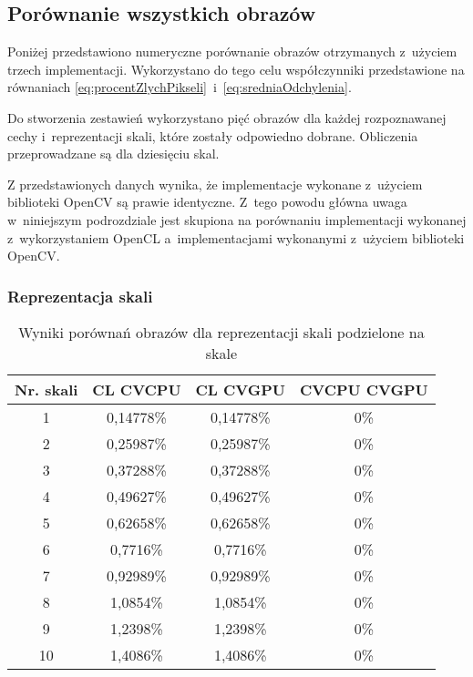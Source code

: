 \subsection{Porównanie wszystkich obrazów}
\label{subsec:porownanieNumerycznePoprawnosc}

Poniżej przedstawiono numeryczne porównanie obrazów otrzymanych z~użyciem trzech implementacji. Wykorzystano do tego celu współczynniki przedstawione na równaniach \ref{eq:procentZlychPikseli}~i~\ref{eq:sredniaOdchylenia}.

Do stworzenia zestawień wykorzystano pięć obrazów dla każdej rozpoznawanej cechy i~reprezentacji skali, które zostały odpowiedno dobrane. Obliczenia przeprowadzane są dla dziesięciu skal.

Z przedstawionych danych wynika, że implementacje wykonane z~użyciem biblioteki OpenCV są prawie identyczne. Z~tego powodu główna uwaga w~niniejszym podrozdziale jest skupiona na porównaniu implementacji wykonanej z~wykorzystaniem OpenCL a~implementacjami wykonanymi z~użyciem biblioteki OpenCV.
\subsubsection{Reprezentacja skali}
\label{subsubsec:reprezentacjaSakliTabele}

\begin{table}
\caption{Wyniki porównań obrazów dla reprezentacji skali podzielone na skale}
\label{tab:imageScaleRep}
\begin{tabular}{|c|c|c|c|}
 \hline
Nr. skali & CL \- CVCPU & CL \- CVGPU & CVCPU \- CVGPU \\ \hline
1 & 0,14778\% & 0,14778\% & 0\% \\ \hline
2 & 0,25987\% & 0,25987\% & 0\% \\ \hline
3 & 0,37288\% & 0,37288\% & 0\% \\ \hline
4 & 0,49627\% & 0,49627\% & 0\% \\ \hline
5 & 0,62658\% & 0,62658\% & 0\% \\ \hline
6 & 0,7716\% & 0,7716\% & 0\% \\ \hline
7 & 0,92989\% & 0,92989\% & 0\% \\ \hline
8 & 1,0854\% & 1,0854\% & 0\% \\ \hline
9 & 1,2398\% & 1,2398\% & 0\% \\ \hline
10 & 1,4086\% & 1,4086\% & 0\% \\ \hline
\end{tabular}
\end{table}

